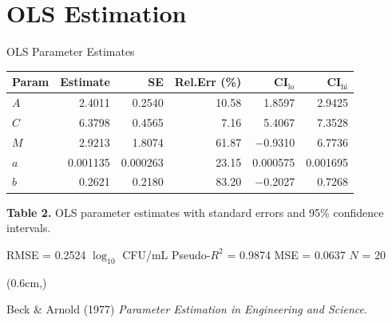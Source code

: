 \documentclass[10pt,aspectratio=169]{beamer}
\newcommand{\citefoot}[1]{%
  \begin{textblock*}{\dimexpr\paperwidth-1.2cm}(0.6cm,\dimexpr\paperheight-0.65cm)
  {\tiny\color{gray}\raggedright #1}
  \end{textblock*}
}
\begin{document}
\section{OLS Estimation}
\begin{frame}{OLS Parameter Estimates}
\centering
{\small
\begin{tabular}{lrrrrr}
\toprule
Param & Estimate & SE & Rel.Err (\%) & CI$_{\text{lo}}$ & CI$_{\text{hi}}$ \\
\midrule
$A$ & 2.4011 & 0.2540 & 10.58 & 1.8597 & 2.9425 \\
$C$ & 6.3798 & 0.4565 &  7.16 & 5.4067 & 7.3528 \\
$M$ & 2.9213 & 1.8074 & 61.87 & $-$0.9310 & 6.7736 \\
$a$ & 0.001135 & 0.000263 & 23.15 & 0.000575 & 0.001695 \\
$b$ & 0.2621 & 0.2180 & 83.20 & $-$0.2027 & 0.7268 \\
\bottomrule
\end{tabular}}

\vspace{0.2em}
{\footnotesize\textbf{Table 2.} OLS parameter estimates with standard errors and 95\% confidence intervals.}

\vspace{0.6em}
{\small RMSE = 0.2524 $\log_{10}$ CFU/mL \hspace{2em} Pseudo-$R^2$ = 0.9874 \hspace{2em} MSE = 0.0637 \hspace{2em} $N$ = 20}
\citefoot{Beck \& Arnold (1977) \textit{Parameter Estimation in Engineering and Science}.}
\end{frame}
\end{document}
